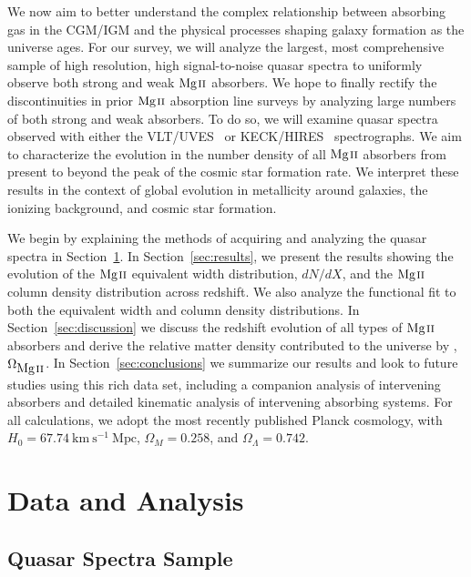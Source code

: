 \documentclass[iop,apj,numberedappendix,appendixfloats,twocolappendix]{emulateapj}
\begin{document}
We now aim to better understand the complex relationship between absorbing gas in the CGM/IGM and the physical processes shaping galaxy formation as the universe ages. For our survey, we will analyze the largest, most comprehensive sample of high resolution, high signal-to-noise quasar spectra to uniformly observe both strong and weak ${\hbox{{\rm Mg}\kern 0.1em{\sc ii}}}$ absorbers. We hope to finally rectify the discontinuities in prior ${\hbox{{\rm Mg}\kern 0.1em{\sc ii}}}$ absorption line surveys by analyzing large numbers of both strong and weak absorbers. To do so, we will examine quasar spectra observed with either the VLT/UVES~\citep{Dekker2000} or KECK/HIRES~\citep{Vogt1994} spectrographs. We aim to characterize the evolution in the number density of all ${\hbox{{\rm Mg}\kern 0.1em{\sc ii}}}$ absorbers from present to beyond the peak of the cosmic star formation rate. We interpret these results in the context of global evolution in metallicity around galaxies, the ionizing background, and cosmic star formation.

We begin by explaining the methods of acquiring and analyzing the quasar spectra in Section~\ref{sec:data}. In Section~\ref{sec:results}, we present the results showing the evolution of the ${\hbox{{\rm Mg}\kern 0.1em{\sc ii}}}$ equivalent width distribution, $dN\!/dX$, and the ${\hbox{{\rm Mg}\kern 0.1em{\sc ii}}}$ column density distribution across redshift. We also analyze the functional fit to both the equivalent width and column density distributions. In Section~\ref{sec:discussion} we discuss the redshift evolution of all types of ${\hbox{{\rm Mg}\kern 0.1em{\sc ii}}}$ absorbers and derive the relative matter density contributed to the universe by {\MgII}, $\Omega_{\hbox{{\rm Mg}\kern 0.1em{\sc ii}}}$. In Section~\ref{sec:conclusions} we summarize our results and look to future studies using this rich data set, including a companion analysis of intervening {\CIV} absorbers and detailed kinematic analysis of intervening absorbing systems. For all calculations, we adopt the most recently published Planck cosmology, with $H_0 = 67.74~\mathrm{km~s^{-1}~Mpc}$, $\Omega_M = 0.258$, and $\Omega_{\Lambda} = 0.742$.


\section{Data and Analysis}
\label{sec:data}

\subsection{Quasar Spectra Sample}
\end{document}

